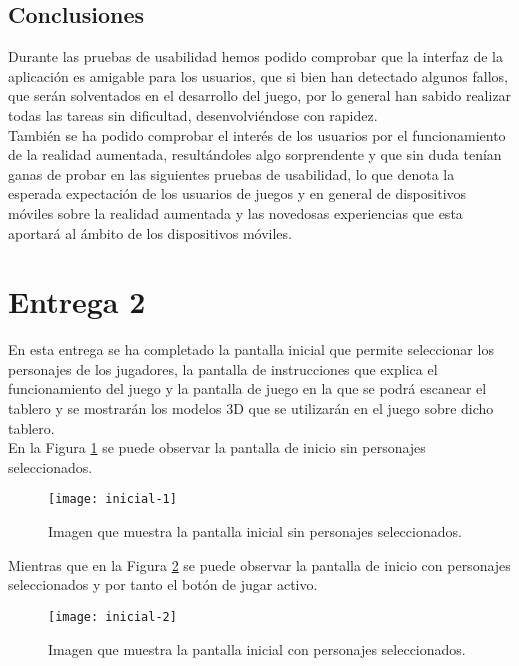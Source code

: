 \subsection{Conclusiones}
Durante las pruebas de usabilidad hemos podido comprobar que la interfaz de la aplicación es amigable para los usuarios, que si bien han detectado algunos fallos, que serán solventados en el desarrollo del juego, por lo general han sabido realizar todas las tareas sin dificultad, desenvolviéndose con rapidez.\\

También se ha podido comprobar el interés de los usuarios por el funcionamiento de la realidad aumentada, resultándoles algo sorprendente y que sin duda tenían ganas de probar en las siguientes pruebas de usabilidad, lo que denota la esperada expectación de los usuarios de juegos y en general de dispositivos móviles sobre la realidad aumentada y las novedosas experiencias que esta aportará al ámbito de los dispositivos móviles.

\section{Entrega 2}
En esta entrega se ha completado la pantalla inicial que permite seleccionar los personajes de los jugadores, la pantalla de instrucciones que explica el funcionamiento del juego y la pantalla de juego en la que se podrá escanear el tablero y se mostrarán los modelos 3D que se utilizarán en el juego sobre dicho tablero.\\

En la Figura \ref{figura-inicial-1} se puede observar la pantalla de inicio sin personajes seleccionados.

\begin{figure}[h]
  \centering
  \texttt{[image: inicial-1]}
  \caption{Imagen que muestra la pantalla inicial sin personajes seleccionados.}
  \label{figura-inicial-1}
\end{figure}

\newpage

Mientras que en la Figura \ref{figura-inicial-2} se puede observar la pantalla de inicio con personajes seleccionados y por tanto el botón de jugar activo.

\begin{figure}[h]
  \centering
  \texttt{[image: inicial-2]}
  \caption{Imagen que muestra la pantalla inicial con personajes seleccionados.}
  \label{figura-inicial-2}
\end{figure}


